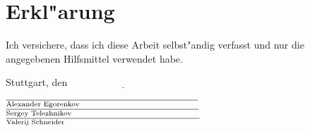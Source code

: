 \section{Erkl"arung}
\label{sec:Erkl"arung}

\vspace{100pt}

Ich versichere, dass ich diese Arbeit selbst"andig verfasst und nur die
angegebenen Hilfsmittel verwendet habe.

\vspace{50pt}

\noindent
Stuttgart, den $\underline{\hspace{128pt}}$

\vspace{50pt}

\noindent
$\overline{\mbox{\scriptsize{Alexander Egorenkov}\hspace{120pt}}}$\\

\noindent
$\overline{\mbox{\scriptsize{Sergey Telezhnikov}\hspace{129pt}}}$\\

\noindent
$\overline{\mbox{\scriptsize{Valerij Schneider}\hspace{137pt}}}$
